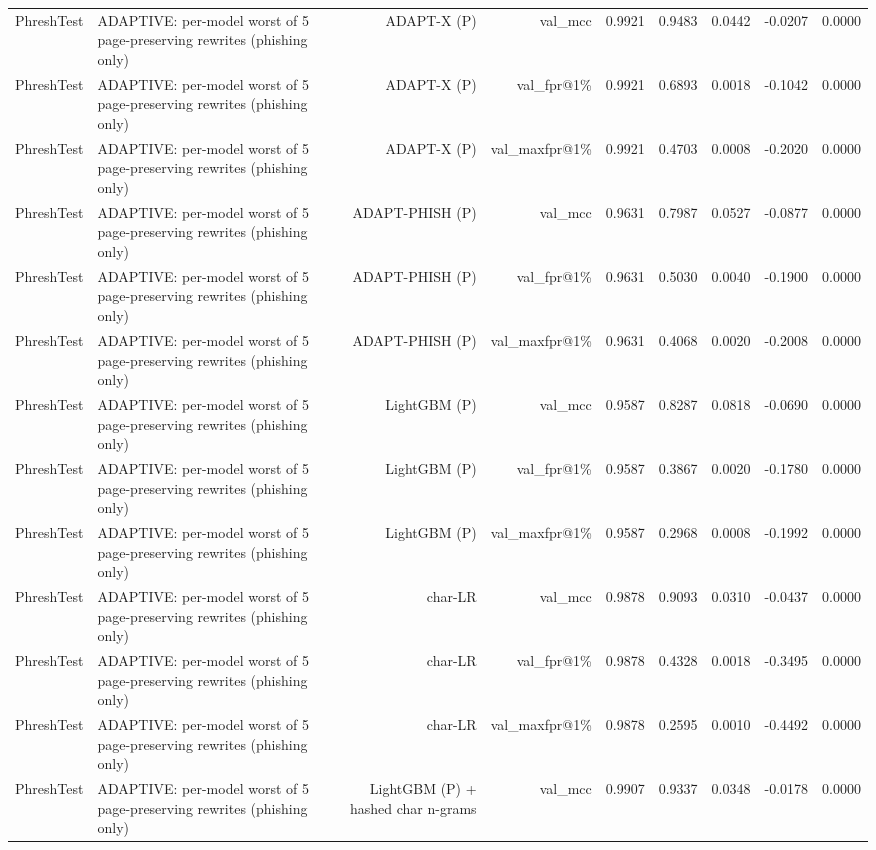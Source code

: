 \begin{table}[t]
\begin{tabular}{llrrrrrrr}
PhreshTest & ADAPTIVE: per-model worst of 5 page-preserving rewrites (phishing only) & ADAPT-X (P) & val\_mcc & 0.9921 & 0.9483 & 0.0442 & -0.0207 & 0.0000 \\
PhreshTest & ADAPTIVE: per-model worst of 5 page-preserving rewrites (phishing only) & ADAPT-X (P) & val\_fpr@1\% & 0.9921 & 0.6893 & 0.0018 & -0.1042 & 0.0000 \\
PhreshTest & ADAPTIVE: per-model worst of 5 page-preserving rewrites (phishing only) & ADAPT-X (P) & val\_maxfpr@1\% & 0.9921 & 0.4703 & 0.0008 & -0.2020 & 0.0000 \\
PhreshTest & ADAPTIVE: per-model worst of 5 page-preserving rewrites (phishing only) & ADAPT-PHISH (P) & val\_mcc & 0.9631 & 0.7987 & 0.0527 & -0.0877 & 0.0000 \\
PhreshTest & ADAPTIVE: per-model worst of 5 page-preserving rewrites (phishing only) & ADAPT-PHISH (P) & val\_fpr@1\% & 0.9631 & 0.5030 & 0.0040 & -0.1900 & 0.0000 \\
PhreshTest & ADAPTIVE: per-model worst of 5 page-preserving rewrites (phishing only) & ADAPT-PHISH (P) & val\_maxfpr@1\% & 0.9631 & 0.4068 & 0.0020 & -0.2008 & 0.0000 \\
PhreshTest & ADAPTIVE: per-model worst of 5 page-preserving rewrites (phishing only) & LightGBM (P) & val\_mcc & 0.9587 & 0.8287 & 0.0818 & -0.0690 & 0.0000 \\
PhreshTest & ADAPTIVE: per-model worst of 5 page-preserving rewrites (phishing only) & LightGBM (P) & val\_fpr@1\% & 0.9587 & 0.3867 & 0.0020 & -0.1780 & 0.0000 \\
PhreshTest & ADAPTIVE: per-model worst of 5 page-preserving rewrites (phishing only) & LightGBM (P) & val\_maxfpr@1\% & 0.9587 & 0.2968 & 0.0008 & -0.1992 & 0.0000 \\
PhreshTest & ADAPTIVE: per-model worst of 5 page-preserving rewrites (phishing only) & char-LR & val\_mcc & 0.9878 & 0.9093 & 0.0310 & -0.0437 & 0.0000 \\
PhreshTest & ADAPTIVE: per-model worst of 5 page-preserving rewrites (phishing only) & char-LR & val\_fpr@1\% & 0.9878 & 0.4328 & 0.0018 & -0.3495 & 0.0000 \\
PhreshTest & ADAPTIVE: per-model worst of 5 page-preserving rewrites (phishing only) & char-LR & val\_maxfpr@1\% & 0.9878 & 0.2595 & 0.0010 & -0.4492 & 0.0000 \\
PhreshTest & ADAPTIVE: per-model worst of 5 page-preserving rewrites (phishing only) & LightGBM (P) + hashed char n-grams & val\_mcc & 0.9907 & 0.9337 & 0.0348 & -0.0178 & 0.0000 \\

\end{tabular}
\end{table}
